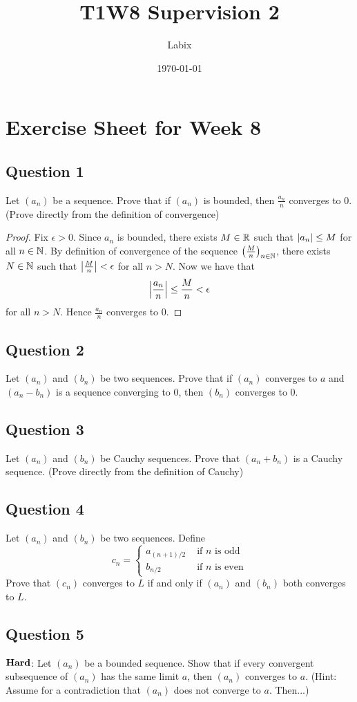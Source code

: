 \documentclass[a4paper]{article}
\title{T1W8 Supervision 2}
\author{Labix}
\date{\today}
\begin{document}
\section*{Exercise Sheet for Week 8}
\subsection*{Question 1}
Let $(a_n)$ be a sequence. Prove that if $(a_n)$ is bounded, then $\frac{a_n}{n}$ converges to $0$. (Prove directly from the definition of convergence)\\
\begin{proof}
Fix $\epsilon>0$. Since $a_n$ is bounded, there exists $M\in\mathbb{R}$ such that $\abs{a_n}\leq M$ for all $n\in\mathbb{N}$. By definition of convergence of the sequence $\left(\frac{M}{n}\right)_{n\in\mathbb{N}}$, there exists $N\in\mathbb{N}$ such that $\abs{\frac{M}{n}}<\epsilon$ for all $n>N$. Now we have that $$\abs{\frac{a_n}{n}}\leq\frac{M}{n}<\epsilon$$ for all $n>N$. Hence $\frac{a_n}{n}$ converges to $0$. 
\end{proof}

\subsection*{Question 2}
Let $(a_n)$ and $(b_n)$ be two sequences. Prove that if $(a_n)$ converges to $a$ and $(a_n-b_n)$ is a sequence converging to $0$, then $(b_n)$ converges to $0$. 

\subsection*{Question 3}
Let $(a_n)$ and $(b_n)$ be Cauchy sequences. Prove that $(a_n+b_n)$ is a Cauchy sequence. (Prove directly from the definition of Cauchy)

\subsection*{Question 4}
Let $(a_n)$ and $(b_n)$ be two sequences. Define $$c_n=\begin{cases}
a_{(n+1)/2} & \text{ if } n\text{ is odd}\\
b_{n/2} & \text{ if }n\text{ is even}
\end{cases}$$ Prove that $(c_n)$ converges to $L$ if and only if $(a_n)$ and $(b_n)$ both converges to $L$. 

\subsection*{Question 5}
$\bold{Hard}$: Let $(a_n)$ be a bounded sequence. Show that if every convergent subsequence of $(a_n)$ has the same limit $a$, then $(a_n)$ converges to $a$. (Hint: Assume for a contradiction that $(a_n)$ does not converge to $a$. Then...)
\end{document}
